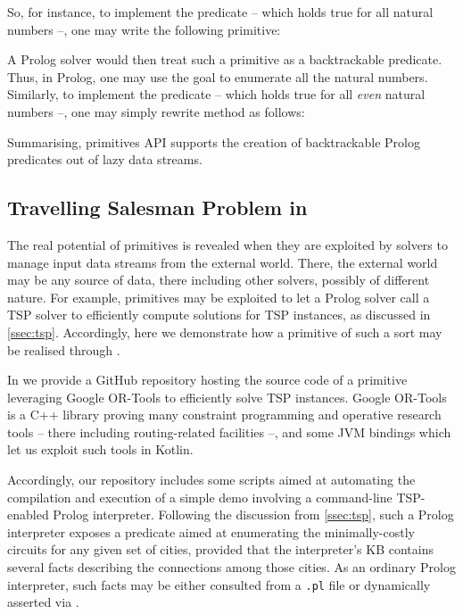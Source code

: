 \documentclass[12pt,a4paper,openright,twoside]{book}
\begin{document}
So, for instance, to implement the predicate  -- which holds true for all natural numbers --, one may write the following primitive:
%

%
A Prolog solver would then treat such a primitive as a backtrackable predicate.
%
Thus, in Prolog, one may use the goal  to enumerate all the natural numbers.
%
Similarly, to implement the predicate  -- which holds true for all \emph{even} natural numbers --, one may simply rewrite method  as follows:
%


Summarising, \twopkt{} primitives API supports the creation of backtrackable Prolog predicates out of lazy data streams.

\subsection{Travelling Salesman Problem in \twopkt{}}

The real potential of primitives is revealed when they are exploited by solvers to manage input data streams from the external world.
%
There, the external world may be any source of data, there including other solvers, possibly of different nature.
%
For example, primitives may be exploited to let a Prolog solver call a TSP solver to efficiently compute solutions for TSP instances, as discussed in \cref{ssec:tsp}.
%
Accordingly, here we demonstrate how a primitive of such a sort may be realised through \twopkt{}.

In \cite{2P-Kt-TSP-Example} we provide a GitHub repository hosting the source code of a \twopkt{} primitive leveraging Google OR-Tools \cite{ortools} to efficiently solve TSP instances.
%
Google OR-Tools is a C++ library proving many constraint programming and operative research tools -- there including routing-related facilities --, and some JVM bindings which let us exploit such tools in Kotlin.

Accordingly, our repository includes some scripts aimed at automating the compilation and execution of a simple demo involving a command-line TSP-enabled Prolog interpreter.
%
Following the discussion from \cref{ssec:tsp}, such a Prolog interpreter exposes a  predicate aimed at enumerating the minimally-costly circuits for any given set of cities, provided that the interpreter's KB contains several  facts describing the connections among those cities.
%
As an ordinary Prolog interpreter, such facts may be either consulted from a \texttt{.pl} file or dynamically asserted via .
\end{document}

